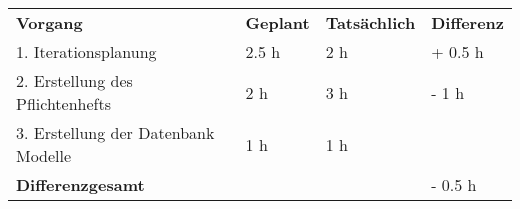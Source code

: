 \begin{tabu}{llll}
\rowfont{\bfseries\leavevmode\color{headingfont}}\textbf{Vorgang} & \textbf{Geplant} & \textbf{Tatsächlich} & \textbf{Differenz} \\
1. Iterationsplanung & 2.5 h & 2 h & + 0.5 h\\ 
2. Erstellung des Pflichtenhefts & 2 h & 3 h & - 1 h \\
3. Erstellung der Datenbank Modelle & 1 h & 1 h & \\
\hline
\hline
{}\textbf{Differenzgesamt} & & & - 0.5 h \\
\end{tabu}
